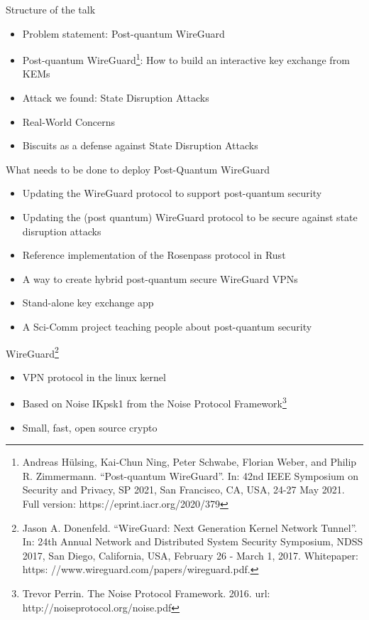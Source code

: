 \begin{frame}{Structure of the talk}
\begin{itemize}
  \item Problem statement: Post-quantum WireGuard %
  \item Post-quantum WireGuard\footnote{
	  Andreas Hülsing, Kai-Chun Ning, Peter Schwabe, Florian Weber, and Philip R. Zimmermann. “Post-quantum WireGuard”. In: 42nd IEEE Symposium on Security and Privacy, SP 2021, San Francisco, CA, USA, 24-27 May 2021. Full version: https://eprint.iacr.org/2020/379
	}: How to build an interactive key exchange from KEMs %
  \item Attack we found: State Disruption Attacks %
  \item Real-World Concerns %
  \item Biscuits as a defense against State Disruption Attacks
\end{itemize}
\end{frame}

\begin{frame}{What needs to be done to deploy Post-Quantum WireGuard}
\begin{itemize}
	\item Updating the WireGuard protocol to support post-quantum security
	\item Updating the (post quantum) WireGuard protocol to be secure against state disruption attacks
	\item Reference implementation of the Rosenpass protocol in Rust
	\item A way to create hybrid post-quantum secure WireGuard VPNs
	\item Stand-alone key exchange app
	\item A Sci-Comm project teaching people about post-quantum security
\end{itemize}
\end{frame}

\begin{frame}{WireGuard\footnote{Jason A. Donenfeld. “WireGuard: Next Generation Kernel Network Tunnel”. In: 24th Annual Network and Distributed System Security Symposium, NDSS 2017, San Diego, California, USA, February 26 - March 1, 2017. Whitepaper: https: //www.wireguard.com/papers/wireguard.pdf.}}
\begin{itemize}
  \item VPN protocol in the linux kernel
  \item Based on Noise IKpsk1 from the Noise Protocol Framework\footnote{Trevor Perrin. The Noise Protocol Framework. 2016. url: http://noiseprotocol.org/noise.pdf}
  \item Small, fast, open source crypto
\end{itemize}
\end{frame}

